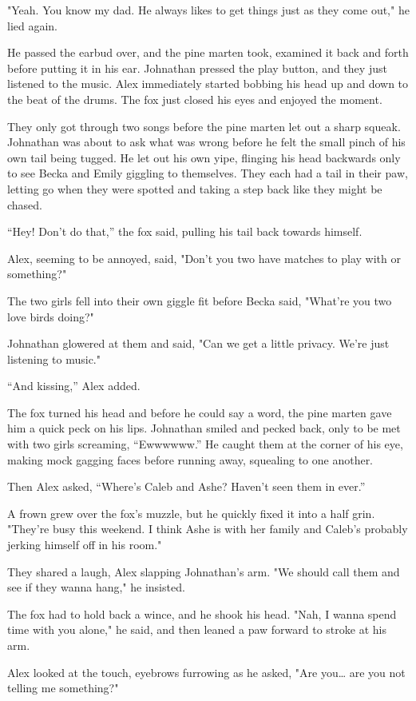 "Yeah. You know my dad. He always likes to get things just as they come
out," he lied again.

He passed the earbud over, and the pine marten took, examined it back
and forth before putting it in his ear. Johnathan pressed the play
button, and they just listened to the music. Alex immediately started
bobbing his head up and down to the beat of the drums. The fox just
closed his eyes and enjoyed the moment.

They only got through two songs before the pine marten let out a sharp
squeak. Johnathan was about to ask what was wrong before he felt the
small pinch of his own tail being tugged. He let out his own yipe,
flinging his head backwards only to see Becka and Emily giggling to
themselves. They each had a tail in their paw, letting go when they were
spotted and taking a step back like they might be chased.

``Hey! Don't do that,'' the fox said, pulling his tail back towards
himself.

Alex, seeming to be annoyed, said, "Don't you two have matches to play
with or something?"

The two girls fell into their own giggle fit before Becka said, "What're
you two love birds doing?"

Johnathan glowered at them and said, "Can we get a little privacy. We're
just listening to music."

``And kissing,'' Alex added.

The fox turned his head and before he could say a word, the pine marten
gave him a quick peck on his lips. Johnathan smiled and pecked back,
only to be met with two girls screaming, ``Ewwwwww.'' He caught them at
the corner of his eye, making mock gagging faces before running away,
squealing to one another.

Then Alex asked, ``Where's Caleb and Ashe? Haven't seen them in ever.''

A frown grew over the fox's muzzle, but he quickly fixed it into a half
grin. "They're busy this weekend. I think Ashe is with her family and
Caleb's probably jerking himself off in his room."

They shared a laugh, Alex slapping Johnathan's arm. "We should call them
and see if they wanna hang," he insisted.

The fox had to hold back a wince, and he shook his head. "Nah, I wanna
spend time with you alone," he said, and then leaned a paw forward to
stroke at his arm.

Alex looked at the touch, eyebrows furrowing as he asked, "Are
you\ldots{} are you not telling me something?"

